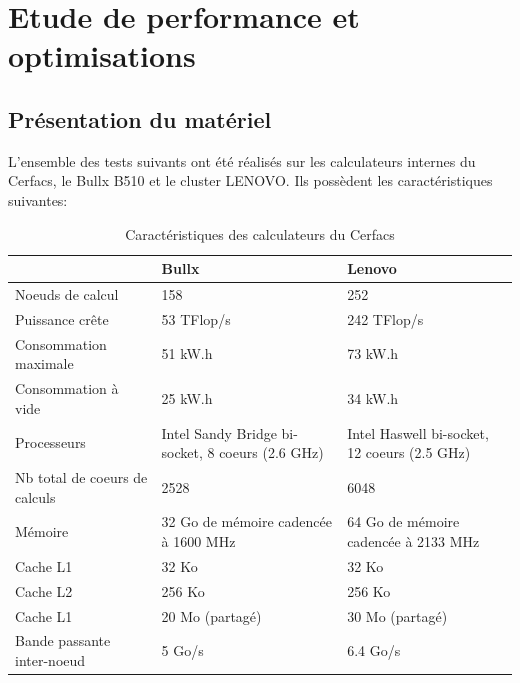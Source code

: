 \section{Etude de performance et optimisations}\label{sec:part3}
\subsection{Présentation du matériel}\label{sec:matos}
L'ensemble des tests suivants ont été réalisés sur les calculateurs internes du Cerfacs, le Bullx B510 et le cluster LENOVO. Ils possèdent les caractéristiques suivantes:

\begin{table}[!ht]
  \begin{center}
    \begin{tabular}{|M{3.5cm}|M{5cm}|M{5cm}|}
      \hline
      & Bullx & Lenovo \\
      \hline
      Noeuds de calcul & 158 & 252 \\
      \hline
      Puissance crête & 53 TFlop/s & 242 TFlop/s \\
      \hline
      Consommation maximale & 51 kW.h & 73 kW.h \\
      \hline
      Consommation à vide & 25 kW.h & 34 kW.h \\
      \hline
      Processeurs & Intel Sandy Bridge bi-socket, 8 coeurs (2.6 GHz) & Intel Haswell bi-socket, 12 coeurs (2.5 GHz) \\
      \hline
      Nb total de coeurs de calculs & 2528 & 6048 \\
      \hline
      Mémoire & 32 Go de mémoire cadencée à 1600 MHz & 64 Go de mémoire cadencée à 2133 MHz \\
      \hline
      Cache L1 & 32 Ko & 32 Ko \\
      \hline
      Cache L2 & 256 Ko & 256 Ko \\
      \hline
      Cache L1 & 20 Mo (partagé) & 30 Mo (partagé) \\
      \hline
      Bande passante inter-noeud & 5 Go/s & 6.4 Go/s \\
      \hline
    \end{tabular}
  \end{center}
  \caption{\label{tab:carac}Caractéristiques des calculateurs du Cerfacs}
\end{table}

